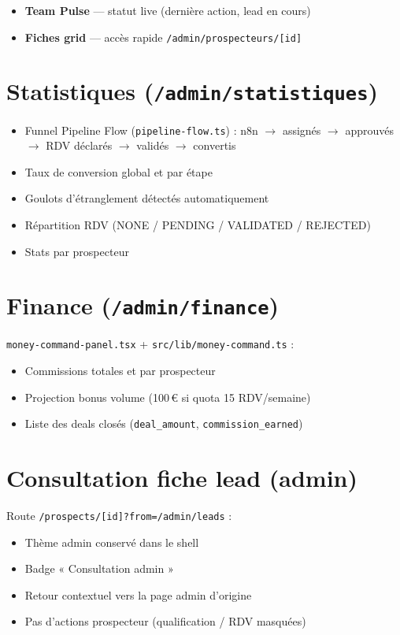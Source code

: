 \documentclass[11pt,a4paper]{report}
\begin{document}
\begin{itemize}[noitemsep]
  \item \textbf{Team Pulse} --- statut live (dernière action, lead en cours)
  \item \textbf{Fiches grid} --- accès rapide \texttt{/admin/prospecteurs/[id]}
\end{itemize}

\section{Statistiques (\texttt{/admin/statistiques})}

\begin{itemize}[noitemsep]
  \item Funnel Pipeline Flow (\texttt{pipeline-flow.ts}) : n8n $\rightarrow$ assignés $\rightarrow$ approuvés $\rightarrow$ RDV déclarés $\rightarrow$ validés $\rightarrow$ convertis
  \item Taux de conversion global et par étape
  \item Goulots d'étranglement détectés automatiquement
  \item Répartition RDV (NONE / PENDING / VALIDATED / REJECTED)
  \item Stats par prospecteur
\end{itemize}

\section{Finance (\texttt{/admin/finance})}

\texttt{money-command-panel.tsx} + \texttt{src/lib/money-command.ts} :
\begin{itemize}[noitemsep]
  \item Commissions totales et par prospecteur
  \item Projection bonus volume (100\,€ si quota 15 RDV/semaine)
  \item Liste des deals closés (\texttt{deal\_amount}, \texttt{commission\_earned})
\end{itemize}

\section{Consultation fiche lead (admin)}

Route \texttt{/prospects/[id]?from=/admin/leads} :
\begin{itemize}[noitemsep]
  \item Thème admin conservé dans le shell
  \item Badge « Consultation admin »
  \item Retour contextuel vers la page admin d'origine
  \item Pas d'actions prospecteur (qualification / RDV masquées)
\end{itemize}
\end{document}
